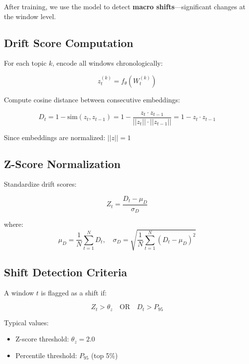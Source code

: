 \documentclass[12pt]{article}
\begin{document}
After training, we use the model to detect \textbf{macro shifts}—significant changes at the window level.

\subsection{Drift Score Computation}

For each topic $k$, encode all windows chronologically:

\begin{equation}
z_t^{(k)} = f_\theta(W_t^{(k)})
\end{equation}

Compute cosine distance between consecutive embeddings:

\begin{equation}
D_t = 1 - \text{sim}(z_t, z_{t-1}) = 1 - \frac{z_t \cdot z_{t-1}}{||z_t|| \cdot ||z_{t-1}||} = 1 - z_t \cdot z_{t-1}
\end{equation}

Since embeddings are normalized: $||z|| = 1$

\subsection{Z-Score Normalization}

Standardize drift scores:

\begin{equation}
Z_t = \frac{D_t - \mu_D}{\sigma_D}
\end{equation}

where:
\begin{equation}
\mu_D = \frac{1}{N} \sum_{t=1}^{N} D_t, \quad \sigma_D = \sqrt{\frac{1}{N} \sum_{t=1}^{N} (D_t - \mu_D)^2}
\end{equation}

\subsection{Shift Detection Criteria}

A window $t$ is flagged as a shift if:

\begin{equation}
Z_t > \theta_z \quad \text{OR} \quad D_t > P_{95}
\end{equation}

Typical values:
\begin{itemize}
    \item Z-score threshold: $\theta_z = 2.0$
    \item Percentile threshold: $P_{95}$ (top 5\%)
\end{itemize}
\end{document}
